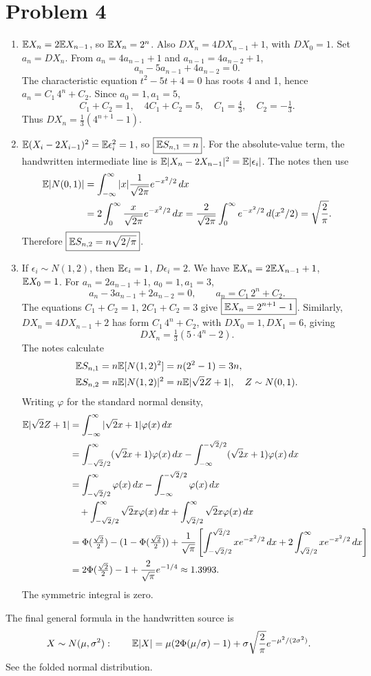 \documentclass[a4paper]{article}
\begin{document}
\section*{Problem 4}
\begin{enumerate}
\item $\mathbb {E} X_n=2\mathbb {E} X_{n-1}$, so $\mathbb {E} X_n=2^n$.
Also $DX_n=4DX_{n-1}+1$, with $DX_0=1$.
Set $a_n=DX_n$. From $a_n=4a_{n-1}+1$ and $a_{n-1}=4a_{n-2}+1$,
\[
a_n-5a_{n-1}+4a_{n-2}=0.
\]
The characteristic equation $t^2-5t+4=0$ has roots 4 and 1, hence
$a_n=C_1\,4^n+C_2$. Since $a_0=1,a_1=5$,
\[
C_1+C_2=1,\quad4C_1+C_2=5,\quad C_1=\tfrac43,\quad C_2=-\tfrac13.
\]
Thus $\boxed{DX_n=\tfrac13(4^{n+1}-1)}$.
\item $\mathbb {E}(X_i-2X_{i-1})^2=\mathbb {E}\epsilon_i^2=1$, so $\boxed{\mathbb {E} S_{n,1}=n}$.
For the absolute-value term, the handwritten intermediate line is
$\mathbb {E}|X_n-2X_{n-1}|^2=\mathbb {E}|\epsilon_i|$. The notes then use
\begin{align*}
\mathbb {E}|N(0,1)|
&=\int_{-\infty}^\infty |x|\frac1{\sqrt{2\pi}}e^{-x^2/2}\,dx\\
&=2\int_0^\infty\frac{x}{\sqrt{2\pi}}e^{-x^2/2}\,dx
=\frac2{\sqrt{2\pi}}\int_0^\infty e^{-x^2/2}\,d(x^2/2)
=\sqrt{\frac2\pi}.
\end{align*}
Therefore $\boxed{\mathbb {E} S_{n,2}=n\sqrt{2/\pi}}$.
\item If $\epsilon_i\sim N(1,2)$, then $\mathbb {E}\epsilon_i=1$, $D\epsilon_i=2$.
We have $\mathbb {E} X_n=2\mathbb {E} X_{n-1}+1$, $\mathbb {E} X_0=1$. For
$a_n=2a_{n-1}+1$, $a_0=1,a_1=3$,
\[
a_n-3a_{n-1}+2a_{n-2}=0,\qquad a_n=C_1\,2^n+C_2.
\]
The equations $C_1+C_2=1$, $2C_1+C_2=3$ give
$\boxed{\mathbb {E} X_n=2^{n+1}-1}$.
Similarly, $DX_n=4DX_{n-1}+2$ has form $C_1\,4^n+C_2$, with
$DX_0=1,DX_1=6$, giving
\[
\boxed{DX_n=\tfrac13(5\cdot4^n-2)}.
\]
The notes calculate
\begin{align*}
\mathbb {E} S_{n,1}&=n\mathbb {E}[N(1,2)^2]=n(2^2-1)=3n,\\
\mathbb {E} S_{n,2}&=n\mathbb {E}|N(1,2)|^2=n\mathbb {E}|\sqrt2Z+1|,\quad Z\sim N(0,1).
\end{align*}
Writing $\varphi$ for the standard normal density,
\begin{align*}
\mathbb {E}|\sqrt2Z+1|
&=\int_{-\infty}^\infty|\sqrt2x+1|\varphi(x)\,dx\\
&=\int_{-\sqrt2/2}^\infty(\sqrt2x+1)\varphi(x)\,dx
-\int_{-\infty}^{-\sqrt2/2}(\sqrt2x+1)\varphi(x)\,dx\\
&=\int_{-\sqrt2/2}^\infty\varphi(x)\,dx
-\int_{-\infty}^{-\sqrt2/2}\varphi(x)\,dx\\
&\quad+\int_{-\sqrt2/2}^\infty\sqrt2x\varphi(x)\,dx
+\int_{\sqrt2/2}^\infty\sqrt2x\varphi(x)\,dx\\
&=\Phi(\tfrac{\sqrt2}{2})-(1-\Phi(\tfrac{\sqrt2}{2}))
+\frac1{\sqrt\pi}\left[
\int_{-\sqrt2/2}^{\sqrt2/2}xe^{-x^2/2}\,dx
+2\int_{\sqrt2/2}^\infty xe^{-x^2/2}\,dx\right]\\
&=2\Phi(\tfrac{\sqrt2}{2})-1+
\frac2{\sqrt\pi}e^{-1/4}\approx1.3993.
\end{align*}
The symmetric integral is zero.
\end{enumerate}
The final general formula in the handwritten source is
\[
X\sim N(\mu,\sigma^2):\qquad
\mathbb {E}|X|=\mu(2\Phi(\mu/\sigma)-1)
+\sigma\sqrt{\frac2\pi}e^{-\mu^2/(2\sigma^2)}.
\]
See the folded normal distribution.
\end{document}
